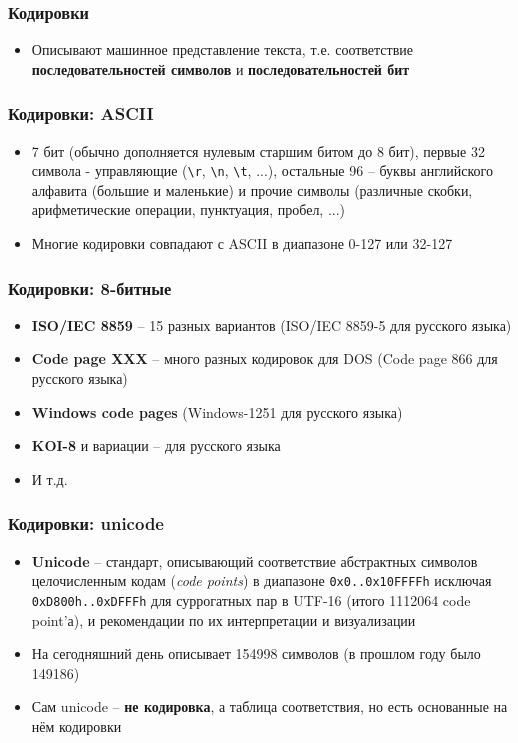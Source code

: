 \documentclass{beamer}
\begin{document}
\begin{frame}[fragile]
\frametitle{Кодировки}
\begin{itemize}
\item Описывают машинное представление текста, т.е. соответствие \alert{\textbf{последовательностей символов}} и \alert{\textbf{последовательностей бит}}
\end{itemize}
\end{frame}

\begin{frame}[fragile]
\frametitle{Кодировки: ASCII}
\begin{itemize}
\item 7 бит (обычно дополняется нулевым старшим битом до 8 бит), первые 32 символа - управляющие (\verb|\r|, \verb|\n|, \verb|\t|, ...), остальные 96 -- буквы английского алфавита (большие и маленькие) и прочие символы (различные скобки, арифметические операции, пунктуация, пробел, ...)
\pause
\item Многие кодировки совпадают с ASCII в диапазоне 0-127 или 32-127
\end{itemize}
\end{frame}

\begin{frame}[fragile]
\frametitle{Кодировки: 8-битные}
\begin{itemize}
\item \textbf{ISO/IEC 8859} -- 15 разных вариантов (ISO/IEC 8859-5 для русского языка)
\pause
\item \textbf{Code page XXX} -- много разных кодировок для DOS (Code page 866 для русского языка)
\pause
\item \textbf{Windows code pages} (Windows-1251 для русского языка)
\pause
\item \textbf{KOI-8} и вариации -- для русского языка
\pause
\item И т.д.
\end{itemize}
\end{frame}

\begin{frame}[fragile]
\frametitle{Кодировки: unicode}
\begin{itemize}
\item \textbf{Unicode} -- стандарт, описывающий соответствие абстрактных символов целочисленным кодам (\textit{code points}) в диапазоне \verb|0x0..0x10FFFFh| исключая \verb|0xD800h..0xDFFFh| для суррогатных пар в UTF-16 (итого 1112064 code point'а), и рекомендации по их интерпретации и визуализации
\pause
\item На сегодняшний день описывает 154998 символов (в прошлом году было 149186)
\pause
\item Сам unicode -- \textbf{не кодировка}, а таблица соответствия, но есть основанные на нём кодировки
\end{itemize}
\end{frame}
\end{document}

